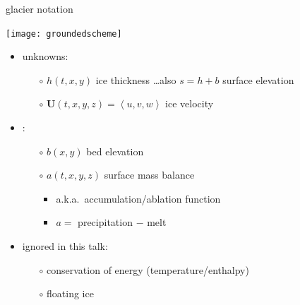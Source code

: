 \documentclass[xcolor={dvipsnames}]{beamer}
\newcommand\bU{\mathbf{U}}
\begin{document}
\begin{frame}{glacier notation}

\begin{center}
\texttt{[image: groundedscheme]}
\end{center}

\begin{itemize}
\item unknowns:
  \begin{itemize}
  \item[$\circ$]  $h(t,x,y)$ ice thickness \hfill \dots also $s=h+b$ surface elevation
  \item[$\circ$]  $\bU(t,x,y,z) = \left<u,v,w\right>$ ice velocity
  \end{itemize}
\item {}:
  \begin{itemize}
  \item[$\circ$]  $b(x,y)$ bed elevation 
  \item[$\circ$]  $a(t,x,y,z)$ surface mass balance  
    \begin{itemize}
    \item a.k.a.~accumulation/ablation function
    \item $a=$ precipitation $-$ melt
    \end{itemize}
  \end{itemize}
\item ignored in this talk:
  \begin{itemize}
  \item[$\circ$]  conservation of energy (temperature/enthalpy)
  \item[$\circ$]  floating ice
  \end{itemize}
\end{itemize}
\end{frame}
\end{document}
